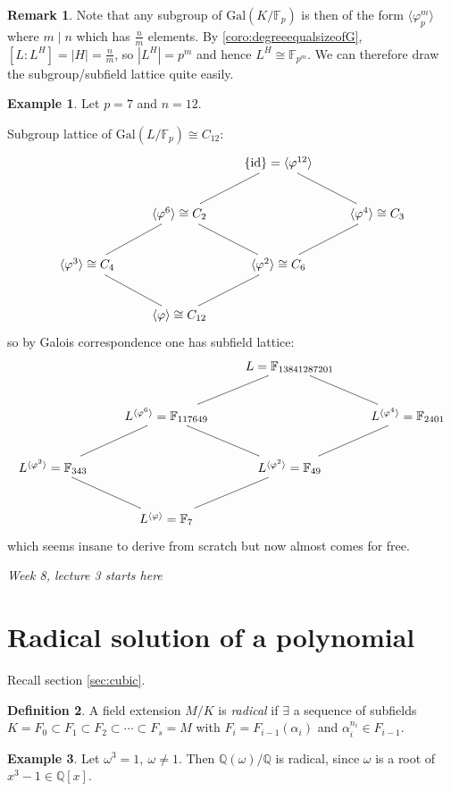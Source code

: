 \documentclass[a4paper]{article}
\newcommand{\Q}{\mathbb Q}
\newcommand{\gal}{\text{Gal}}
\newcommand{\id}{\text{id}}
\theoremstyle{definition}
\newtheorem{defn}{Definition}[subsection]
\newtheorem{example}[defn]{Example}
\newtheorem*{remark}{Remark}
\begin{document}
\begin{remark}
Note that any subgroup of $\gal(K/\mathbb F_p)$ is then of the form $\langle\varphi_p^m\rangle$ where $m\mid n$ which has $\frac{n}{m}$ elements. By \ref{coro:degreeequalsizeofG}, $[L:L^H]=|H|=\frac{n}{m}$, so $|L^H|=p^m$ and hence $L^H\cong\mathbb F_{p^m}$. We can therefore draw the subgroup/subfield lattice quite easily.
\end{remark}
\begin{example}
Let $p=7$ and $n=12$.

Subgroup lattice of $\gal(L/\mathbb F_p)\cong C_{12}$:
\[
\xymatrix{
& & \{\id\}=\langle\varphi^{12}\rangle\ar@{-}[dl]\ar@{-}[dr] \\
& \langle\varphi^6\rangle\cong C_2\ar@{-}[dl]\ar@{-}[dr] & & \langle\varphi^4\rangle\cong C_3\ar@{-}[dl] \\
\langle\varphi^3\rangle\cong C_4\ar@{-}[dr] & & \langle\varphi^2\rangle\cong C_6\ar@{-}[dl] \\
& \langle\varphi\rangle\cong C_{12}
}
\]
so by Galois correspondence one has subfield lattice:
\[
\xymatrix{
& & L=\mathbb F_{13841287201}\ar@{-}[dl]\ar@{-}[dr] \\
& L^{\langle\varphi^6\rangle}=\mathbb F_{117649}\ar@{-}[dl]\ar@{-}[dr] & & L^{\langle\varphi^4\rangle}=\mathbb F_{2401}\ar@{-}[dl] \\
L^{\langle\varphi^3\rangle}=\mathbb F_{343}\ar@{-}[dr] & & L^{\langle\varphi^2\rangle}=\mathbb F_{49}\ar@{-}[dl] \\
& L^{\langle\varphi\rangle}=\mathbb F_7
}
\]
which seems insane to derive from scratch but now almost comes for free.
\end{example}

\begin{flushright}
\textit{Week 8, lecture 3 starts here}
\end{flushright}

\section{Radical solution of a polynomial}
Recall section \ref{sec:cubic}.
\begin{defn}
A field extension $M/K$ is \textit{radical} if $\exists$ a sequence of subfields $K=F_0\subset F_1\subset F_2\subset\cdots\subset F_s=M$ with $F_i=F_{i-1}(\alpha_i)$ and $\alpha_i^{n_i}\in F_{i-1}$.
\end{defn}

\begin{example}
Let $\omega^3=1,\ \omega\neq 1$. Then $\Q(\omega)/\Q$ is radical, since $\omega$ is a root of $x^3-1\in\Q[x]$.
\end{example}
\end{document}
